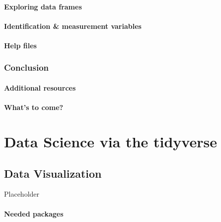 \documentclass[
  12pt, krantz2,
]{krantz}
\begin{document}
\hypertarget{exploredataframes}{%
\subsection{Exploring data frames}\label{exploredataframes}}

\hypertarget{identification-vs-measurement-variables}{%
\subsection{Identification \& measurement variables}\label{identification-vs-measurement-variables}}

\hypertarget{help-files}{%
\subsection{Help files}\label{help-files}}

\hypertarget{conclusion}{%
\section{Conclusion}\label{conclusion}}

\hypertarget{additional-resources}{%
\subsection{Additional resources}\label{additional-resources}}

\hypertarget{whats-to-come}{%
\subsection{What's to come?}\label{whats-to-come}}

\hypertarget{part-data-science-via-the-tidyverse}{%
\part{Data Science via the tidyverse}\label{part-data-science-via-the-tidyverse}}

\hypertarget{viz}{%
\chapter{Data Visualization}\label{viz}}

Placeholder

\hypertarget{needed-packages}{%
\subsection*{Needed packages}\label{needed-packages}}
\end{document}
